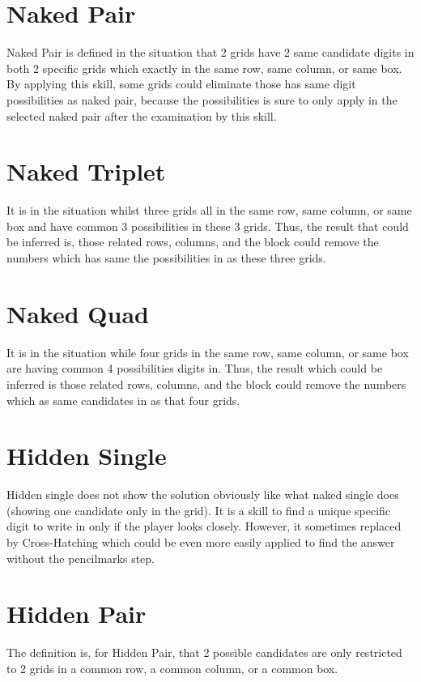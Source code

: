 \documentclass[11pt]{report}
\begin{document}
\section{Naked Pair}
\label{sec:Naked Pair}
Naked Pair is defined in the situation that 2 grids have 2 same candidate digits in both 2 specific grids which exactly in the same row, same column, or same box. By applying this skill, some grids could eliminate those has same digit possibilities as naked pair, because the possibilities is sure to only apply in the selected naked pair after the examination by this skill.

\section{Naked Triplet}
\label{sec:Naked Triplet}
It is in the situation whilst three grids all in the same row, same column, or same box and have common 3 possibilities in these 3 grids. Thus, the result that could be inferred is, those related rows, columns, and the block could remove the numbers which has same the possibilities in as these three grids.

\section{Naked Quad}
\label{sec:Naked Quad}
It is in the situation while four grids in the same row, same column, or same box are having common 4 possibilities digits in. Thus, the result which could be inferred is those related rows, columns, and the block could remove the numbers which as same candidates in as that four grids.

\section{Hidden Single}
\label{sec:Hidden Single}
Hidden single does not show the solution obviously like what naked single does (showing one candidate only in the grid). It is a skill to find a unique specific digit to write in only if the player looks closely. However, it sometimes replaced by Cross-Hatching which could be even more easily applied to find the answer without the pencilmarks step. 

\section{Hidden Pair}
\label{sec:Hidden Pair}
The definition is, for Hidden Pair, that 2 possible candidates are only restricted to 2 grids in a common row, a common column, or a common box. 
\end{document}
